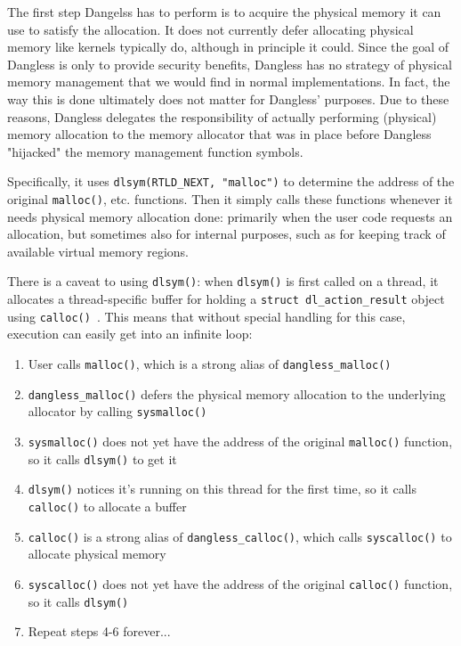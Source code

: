 The first step Dangelss has to perform is to acquire the physical memory it can use to satisfy the allocation. It does not currently defer allocating physical memory like kernels typically do, although in principle it could.
Since the goal of Dangless is only to provide security benefits, Dangless has no strategy of physical memory management that we would find in normal implementations. In fact, the way this is done ultimately does not matter for Dangless' purposes. Due to these reasons, Dangless delegates the responsibility of actually performing (physical) memory allocation to the memory allocator that was in place before Dangless "hijacked" the memory management function symbols.

Specifically, it uses \lstinline!dlsym(RTLD_NEXT, "malloc")! to determine the address of the original \lstinline!malloc()!, etc. functions. Then it simply calls these functions whenever it needs physical memory allocation done: primarily when the user code requests an allocation, but sometimes also for internal purposes, such as for keeping track of available virtual memory regions.

There is a caveat to using \lstinline!dlsym()!: when \lstinline!dlsym()! is first called on a thread, it allocates a thread-specific buffer for holding a \lstinline!struct dl_action_result! object using \lstinline!calloc()!~\cite{glibc-dlsym-calls-calloc}. This means that without special handling for this case, execution can easily get into an infinite loop:

\begin{enumerate}
	\item User calls \lstinline!malloc()!, which is a strong alias of \lstinline!dangless_malloc()!
	\item \lstinline!dangless_malloc()! defers the physical memory allocation to the underlying allocator by calling \lstinline!sysmalloc()!
	\item \lstinline!sysmalloc()! does not yet have the address of the original \lstinline!malloc()! function, so it calls \lstinline!dlsym()! to get it
	\item \lstinline!dlsym()! notices it's running on this thread for the first time, so it calls \lstinline!calloc()! to allocate a buffer
	\item \lstinline!calloc()! is a strong alias of \lstinline!dangless_calloc()!, which calls \lstinline!syscalloc()! to allocate physical memory
	\item \lstinline!syscalloc()! does not yet have the address of the original \lstinline!calloc()! function, so it calls \lstinline!dlsym()!
	\item Repeat steps 4-6 forever...
\end{enumerate}


